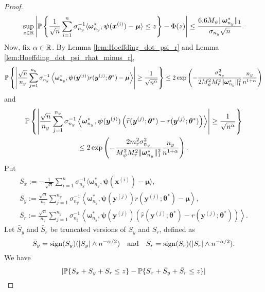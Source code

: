 \documentclass[11pt]{article}
\numberwithin{equation}{section}
\numberwithin{theorem}{section}
\def\fatx{\boldsymbol{x}}
\def\faty{\boldsymbol{y}}
\def\fatmu{\boldsymbol{\mu}}
\def\fattheta{\boldsymbol{\theta}}
\def\fatpsi{\boldsymbol{\psi}}
\def\fatomega{\boldsymbol{\omega}}
\theoremstyle{definition}
\theoremstyle{remark}
\begin{document}
\begin{proof}
\begin{equation}
\sup_{z \in \RR} \left| \PP\left\{ \frac{1}{\sqrt{n}} \sum_{i=1}^n \sigma_{n_y}^{-1} \langle \fatomega_{n_y}^*, \fatpsi(\fatx^{(i)}) - \fatmu \rangle \leq z \right\} - \Phi(z) \right| \leq \frac{6.6 M_\psi \|\fatomega_{n_y}^*\|_1}{\sigma_{n_y} \sqrt{n}}.
\end{equation}
Now, fix $\alpha \in \mathbb{R}$.
By Lemma \ref{lem:Hoeffding_dot_psi_r} and Lemma \ref{lem:Hoeffding_dot_psi_rhat_minus_r},
\begin{equation}
\PP\left\{ \left| \frac{\sqrt{n}}{n_y} \sum_{j=1}^{n_y} \sigma_{n_y}^{-1} \left\langle \fatomega_{n_y}^*, \fatpsi(\faty^{(j)}) r(\faty^{(j)};\fattheta^*) - \fatmu \right\rangle \right| \geq \frac{1}{\sqrt{n^\alpha}} \right\}
\leq 2\exp\left( -\frac{\sigma_{n_y}^2}{2 M_\psi^2 M_r^2 \|\fatomega_{n_y}^*\|_1^2} \frac{n_y}{n^{1+\alpha}} \right)
\end{equation}
and
\begin{multline}
\PP\left\{ \left| \frac{\sqrt{n}}{n_y} \sum_{j=1}^{n_y} \sigma_{n_y}^{-1} \left\langle \fatomega_{n_y}^*, \fatpsi(\faty^{(j)}) \left( \hat r(\faty^{(j)};\fattheta^*) - r(\faty^{(j)};\fattheta^*) \right) \right\rangle \right| \geq \frac{1}{\sqrt{n^
\alpha}} \right\} \\
\leq 2\exp\left( -\frac{2 m_r^2 \sigma_{n_y}^2}{M_\psi^2 M_r^2 \|\fatomega_{n_y}^*\|_1^2} \frac{n_y}{n^{1+\alpha}} \right).
\end{multline}
Put
\begin{gather*}
S_x := -\frac{1}{\sqrt{n}} \sum_{i=1}^n \sigma_{n_y}^{-1} \langle \fatomega_{n_y}^*, \fatpsi(\fatx^{(i)}) - \fatmu \rangle, \\
S_y := \frac{\sqrt{n}}{n_y} \sum_{j=1}^{n_y} \sigma_{n_y}^{-1} \left\langle \fatomega_{n_y}^*, \fatpsi(\faty^{(j)}) r(\faty^{(j)};\fattheta^*) - \fatmu \right\rangle, \\
S_r := \frac{\sqrt{n}}{n_y} \sum_{j=1}^{n_y} \sigma_{n_y}^{-1} \left\langle \fatomega_{n_y}^*, \fatpsi(\faty^{(j)}) \left( \hat r(\faty^{(j)};\fattheta^*) - r(\faty^{(j)};\fattheta^*) \right) \right\rangle.
\end{gather*}
Let $\bar S_y$ and $\bar S_r$ be truncated versions of $S_y$ and $S_r$, defined as
\begin{equation}
\bar S_y = \mathop{\mathrm{sign}}(S_y)(|S_y| \wedge n^{-\alpha/2})
\quad \text{and} \quad
\bar S_r = \mathop{\mathrm{sign}}(S_r)(|S_r| \wedge n^{-\alpha/2}).
\end{equation}
We have
\begin{equation}
|\PP\{ S_x + S_y + S_r \leq z \} - \PP\{ S_x + \bar S_y + \bar S_r \leq z \}|

\end{equation}
\end{proof}
\end{document}
